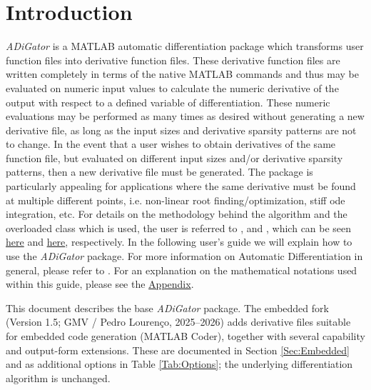 \documentclass[10pt,pdftex]{article}
\begin{document}
\section{Introduction}
\emph{ADiGator} is a MATLAB automatic differentiation package which transforms user function files into derivative function files. These derivative function files are written completely in terms of the native MATLAB commands and thus may be evaluated on numeric input values to calculate the numeric derivative of the output with respect to a defined variable of differentiation. These numeric evaluations may be performed as many times as desired without generating a new derivative file, as long as the input sizes and derivative sparsity patterns are not to change. In the event that a user wishes to obtain derivatives of the same function file, but evaluated on different input sizes and/or derivative sparsity patterns, then a new derivative file must be generated. The package is particularly appealing for applications where the same derivative must be found at multiple different points, i.e. non-linear root finding/optimization, stiff ode integration, etc. For details on the methodology behind the algorithm and the overloaded class which is used, the user is referred to \cite{Weinstein2014}, and \cite{Patterson2013}, which can be seen \href{http://vdol.mae.ufl.edu/JournalPublications/TOMS-2013-0067.pdf}{here} and \href{http://vdol.mae.ufl.edu/JournalPublications/TOMS-2011-0055.pdf}{here}, respectively.
In the following user's guide we will explain how to use the \emph{ADiGator} package. For more information on Automatic Differentiation in general, please refer to  \cite{Griewank1}. For an explanation on the mathematical notations used within this guide, please see the \hyperlink{Appendix}{Appendix}.

This document describes the base \emph{ADiGator} package. The embedded fork (Version 1.5; GMV / Pedro Louren\c{c}o, 2025--2026) adds derivative files suitable for embedded code generation (MATLAB Coder), together with several capability and output-form extensions. These are documented in Section \ref{Sec:Embedded} and as additional options in Table \ref{Tab:Options}; the underlying differentiation algorithm is unchanged.
\end{document}
